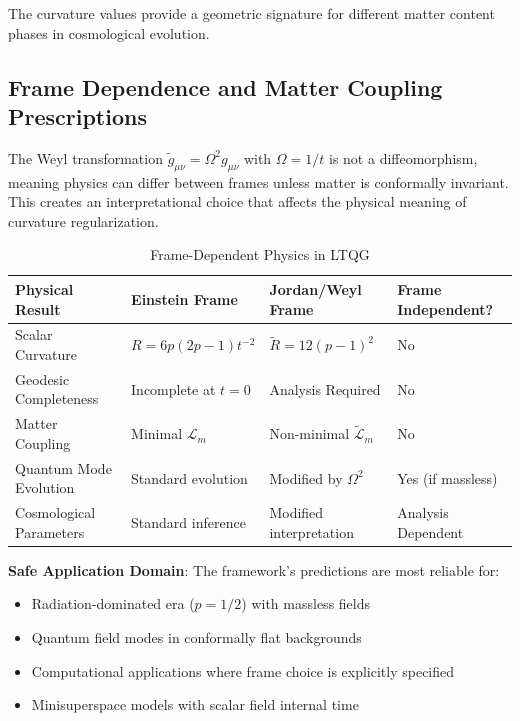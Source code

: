 The curvature values provide a geometric signature for different matter content phases in cosmological evolution.

\subsection{Frame Dependence and Matter Coupling Prescriptions}
\label{subsec:frame_dependence}

The Weyl transformation $\tilde{g}_{\mu\nu} = \Omega^2 g_{\mu\nu}$ with $\Omega = 1/t$ is not a diffeomorphism, meaning physics can differ between frames unless matter is conformally invariant. This creates an interpretational choice that affects the physical meaning of curvature regularization.

\begin{table}[htbp]
\centering
\caption{Frame-Dependent Physics in LTQG}
\label{tab:frame_dependence}
\small
\begin{tabular}{|p{2.5cm}|p{3.0cm}|p{3.0cm}|p{2.5cm}|}
\hline
\textbf{Physical Result} & \textbf{Einstein Frame} & \textbf{Jordan/Weyl Frame} & \textbf{Frame Independent?} \\
\hline
Scalar Curvature & $R = 6p(2p-1)t^{-2}$ & $\tilde{R} = 12(p-1)^2$ & No \\
\hline
Geodesic Completeness & Incomplete at $t=0$ & Analysis Required & No \\
\hline
Matter Coupling & Minimal $\mathcal{L}_m$ & Non-minimal $\tilde{\mathcal{L}}_m$ & No \\
\hline
Quantum Mode Evolution & Standard evolution & Modified by $\Omega^2$ & Yes (if massless) \\
\hline
Cosmological Parameters & Standard inference & Modified interpretation & Analysis Dependent \\
\hline
\end{tabular}
\end{table}

\textbf{Safe Application Domain}: The framework's predictions are most reliable for:
\begin{itemize}
\item Radiation-dominated era ($p = 1/2$) with massless fields
\item Quantum field modes in conformally flat backgrounds  
\item Computational applications where frame choice is explicitly specified
\item Minisuperspace models with scalar field internal time
\end{itemize}

